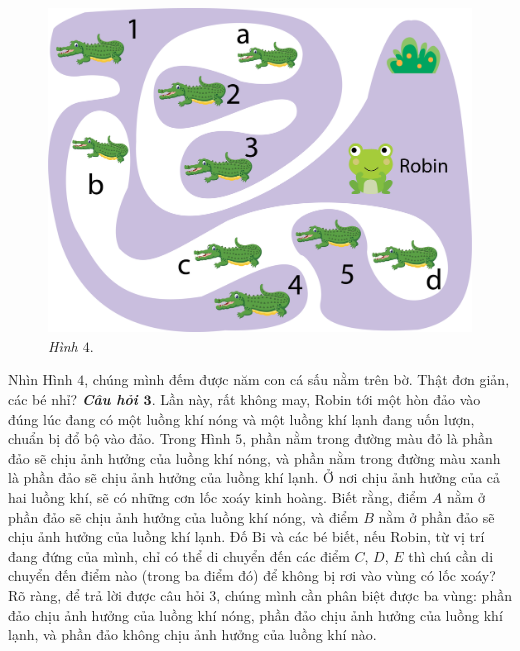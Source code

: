 \begin{multicols}{2}
\begin{figure}[H]
		\includegraphics[width=1\linewidth]{pic13}
		\caption{\small\textit{Hình $4.$}}
		\vspace*{-10pt}
	\end{figure}
	Nhìn Hình $4$, chúng mình đếm được năm con cá sấu nằm trên bờ. Thật đơn giản, các bé nhỉ?
	\vskip 0.1cm
	\textbf{\color{toancuabi}\textit{Câu hỏi $\pmb{3.}$}} Lần này, rất không may, Robin tới một hòn đảo vào đúng lúc đang có một luồng khí nóng và một luồng khí lạnh đang uốn lượn, chuẩn bị đổ bộ vào đảo. Trong  Hình $5$, phần nằm trong đường màu đỏ là phần đảo sẽ chịu ảnh hưởng của luồng khí nóng, và phần nằm trong đường màu xanh là phần đảo sẽ chịu ảnh hưởng của luồng khí lạnh. Ở nơi chịu ảnh hưởng của cả hai luồng khí, sẽ có những cơn lốc xoáy kinh hoàng. Biết rằng, điểm $A$ nằm ở phần đảo sẽ chịu ảnh hưởng của luồng khí nóng, và điểm  $B$ nằm ở phần đảo sẽ chịu ảnh hưởng của luồng khí lạnh. Đố Bi và các bé biết, nếu Robin, từ vị trí đang đứng của mình, chỉ có thể di chuyển đến các điểm $C$, $D$, $E$ thì chú cần di chuyển đến điểm nào (trong ba điểm đó) để không bị rơi vào vùng có  lốc xoáy?
	\vskip 0.01cm
	Rõ ràng, để trả lời được câu hỏi $3$, chúng mình cần phân biệt được ba vùng: phần đảo chịu ảnh hưởng của luồng khí nóng, phần đảo chịu ảnh hưởng của luồng khí lạnh, và phần đảo không chịu ảnh hưởng của luồng khí nào.
	\begin{figure}[H]
		\vspace*{-5pt}
		\centering
		\captionsetup{labelformat=empty, justification=centering}

\end{figure}
\end{multicols}
